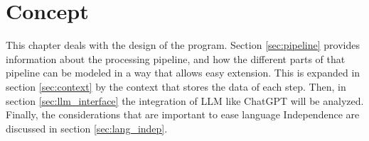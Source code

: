 \begingroup
\renewcommand{\cleardoublepage}{} %
\renewcommand{\clearpage}{}
\chapter{Concept}\label{chapter:conception}
\endgroup
This chapter deals with the design of the program. Section \ref{sec:pipeline}  provides information about the processing pipeline, and how the different parts of that pipeline can be modeled in a way that allows easy extension. This is expanded in section \ref{sec:context} by the context that stores the data of each step. Then, in section \ref{sec:llm_interface} the integration of \ac{LLM} like ChatGPT will be analyzed. Finally, the considerations that are important to ease language Independence are discussed in section \ref{sec:lang_indep}.

\hfill\hfill






